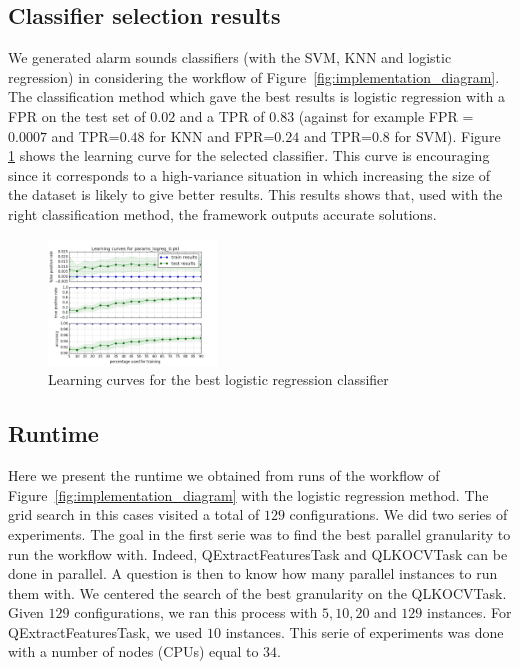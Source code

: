 \documentclass[10pt, conference, compsocconf]{IEEEtran}
\begin{document}
\subsection{Classifier selection results}
We generated alarm sounds classifiers (with the SVM, KNN and logistic regression) in considering the workflow of 
Figure~\ref{fig:implementation_diagram}. 
The classification method which gave the best results is logistic regression with a FPR on the test set of $0.02$ and a TPR of $0.83$ (against for example FPR = $0.0007$ and TPR=$0.48$ for KNN and FPR=$0.24$ and TPR=$0.8$ for SVM). Figure \ref{fig:learning_curve} shows the learning curve for the selected classifier. This curve is encouraging since it corresponds to a high-variance situation in which increasing the size of the dataset is likely to give better results. This results shows that, used with the right classification method, the framework outputs accurate solutions. 
\begin{figure}[h]
  \centering
  \includegraphics[width=0.4\textwidth]{Figures/learning_curve_logreg0_newdata.png}
  \caption{Learning curves for the best logistic regression classifier \label{fig:learning_curve}}
\end{figure}

\subsection{Runtime}
Here we present the runtime we obtained from runs of the workflow of Figure~\ref{fig:implementation_diagram} with the logistic 
regression method. The grid search in this cases visited a total of $129$ configurations. We did two series of experiments. 
The goal in the first serie was to find the best parallel granularity to run the workflow with. Indeed, 
QExtractFeaturesTask and QLKOCVTask can be done in parallel. A question is then to know how 
many parallel instances to run them with. We centered the search of the best granularity on the QLKOCVTask. 
Given $129$ configurations, we ran this process with $5, 10, 20$ and $129$ instances. For QExtractFeaturesTask,  
we used $10$ instances. This serie of experiments was done with a number of nodes (CPUs) equal to $34$. 
\end{document}
